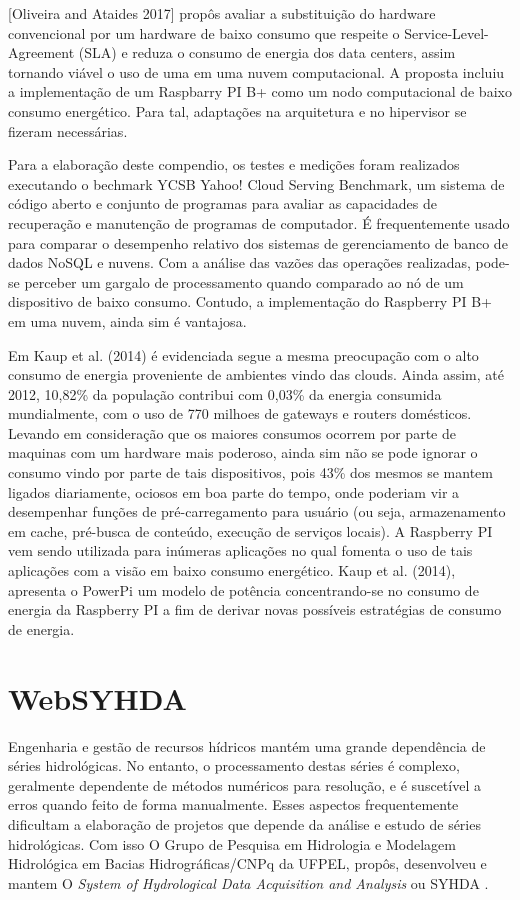 \documentclass[12pt,english,brazil]{article}
\begin{document}
[Oliveira and Ataides 2017] propôs avaliar a substituição do hardware convencional por um hardware de baixo consumo que respeite o Service-Level-Agreement (SLA) e reduza o consumo de energia dos data centers, assim tornando viável o uso de uma em uma nuvem computacional. A proposta incluiu a implementação de um Raspbarry PI B+ como um nodo computacional de baixo consumo energético. Para tal, adaptações na arquitetura e no hipervisor  se fizeram necessárias.

Para a elaboração deste compendio, os testes e medições foram realizados executando o bechmark YCSB Yahoo! Cloud Serving Benchmark, um sistema de código aberto e conjunto de programas para avaliar as capacidades de recuperação e manutenção de programas de computador. É frequentemente usado para comparar o desempenho relativo dos sistemas de gerenciamento de banco de dados NoSQL e nuvens. Com a análise das vazões das operações realizadas, pode-se perceber um gargalo de processamento quando comparado ao nó de um dispositivo de baixo consumo. Contudo, a implementação do Raspberry PI B+ em uma nuvem, ainda sim é vantajosa.

Em Kaup et al. (2014) é evidenciada segue a mesma preocupação com o alto consumo de energia proveniente de ambientes vindo das clouds. Ainda assim, até 2012, 10,82\% da população contribui com 0,03\% da energia consumida mundialmente, com o uso de 770 milhoes de gateways e routers domésticos. Levando em consideração que os maiores consumos ocorrem por parte de maquinas com um hardware mais poderoso, ainda sim não se pode ignorar o consumo vindo por parte de tais dispositivos, pois 43\% dos mesmos se mantem ligados diariamente, ociosos em boa parte do tempo, onde poderiam vir a desempenhar funções de pré-carregamento para usuário (ou seja, armazenamento em cache, pré-busca de conteúdo, execução de serviços locais). A Raspberry PI vem sendo utilizada para inúmeras aplicações no qual fomenta o uso de tais aplicações com a visão em baixo consumo energético. Kaup et al. (2014), apresenta o PowerPi um modelo de  potência concentrando-se no consumo de energia da Raspberry PI a fim de derivar novas possíveis estratégias de consumo de energia.



\section{WebSYHDA}\label{sec:websyhda}

Engenharia e gestão de recursos hídricos mantém uma grande dependência de séries hidrológicas. No entanto, o processamento destas séries é complexo, geralmente dependente de métodos numéricos para resolução, e é suscetível a erros quando feito de forma manualmente. Esses aspectos frequentemente dificultam a elaboração de projetos que depende da análise e estudo de séries hidrológicas. Com isso O Grupo de Pesquisa em Hidrologia e Modelagem Hidrológica em Bacias Hidrográficas/CNPq da UFPEL, propôs, desenvolveu e mantem O \emph{System of Hydrological Data Acquisition and Analysis} ou SYHDA \cite{syhda}.
\end{document}
